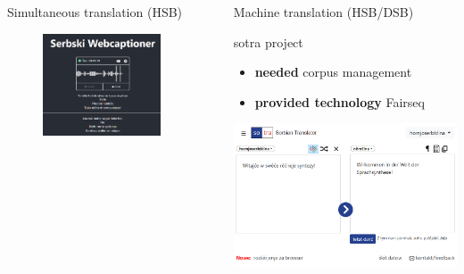 \documentclass[final]{beamer}
\newlength{\sepwidth}
\newlength{\colwidth}
\newcommand{\separatorcolumn}{\begin{column}{\sepwidth}\end{column}}
\begin{document}
\begin{frame}[t]
\begin{columns}[t]
\begin{column}{\colwidth}
\begin{block}{Simultaneous translation (HSB)}
    \begin{figure}
        \centering
        \includegraphics[width=0.8\colwidth]{webcaptioner_klein.png}
        \label{fig:webcaptioner}
    \end{figure}

  \end{block}

\end{column}

\separatorcolumn

\begin{column}{\colwidth}

  \begin{block}{Machine translation (HSB/DSB)}

    sotra project

    \begin{itemize}
      \item \textbf{needed} corpus management
      \item \textbf{provided technology} Fairseq
    \end{itemize}

    \includegraphics[width=\colwidth]{sotra.png}


\end{block}
\end{column}
\end{columns}
\end{frame}
\end{document}
